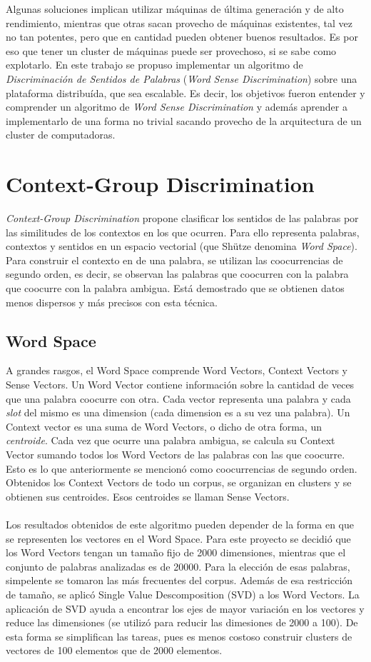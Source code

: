 \documentclass[10pt]{article}
\begin{document}
Algunas soluciones implican utilizar máquinas de última generación y de alto rendimiento, mientras que otras sacan provecho de máquinas existentes, tal vez no tan potentes, pero que en cantidad pueden obtener buenos resultados.
Es por eso que tener un cluster de máquinas puede ser provechoso, si se sabe como explotarlo. En este trabajo se propuso implementar un algoritmo de \emph{Discriminación de Sentidos de Palabras} (\emph{Word Sense Discrimination}) sobre una plataforma distribuída, que sea escalable. Es decir, los objetivos fueron entender y comprender un algoritmo de \emph{Word Sense Discrimination} y además aprender a implementarlo de una forma no trivial sacando provecho de la arquitectura de un cluster de computadoras.

\section{Context-Group Discrimination}
\emph{Context-Group Discrimination} propone clasificar los sentidos de las palabras por las similitudes de los contextos en los que ocurren. Para ello representa palabras, contextos y sentidos en un espacio vectorial (que Shütze denomina \emph{Word Space}). Para construir el contexto en de una palabra, se utilizan las coocurrencias de segundo orden, es decir, se observan las palabras que coocurren con la palabra que coocurre con la palabra ambigua. Está demostrado que se obtienen datos menos dispersos y más precisos con esta técnica.
\subsection{Word Space}
A grandes rasgos, el Word Space comprende Word Vectors, Context Vectors y Sense Vectors.
Un Word Vector contiene información sobre la cantidad de veces que una palabra coocurre con otra. Cada vector representa una palabra y cada \emph{slot} del mismo es una dimension (cada dimension es a su vez una palabra).
Un Context vector es una suma de Word Vectors, o dicho de otra forma, un \emph{centroide}. Cada vez que ocurre una palabra ambigua, se calcula su Context Vector sumando todos los Word Vectors de las palabras con las que coocurre. Esto es lo que anteriormente se mencionó como coocurrencias de segundo orden.
Obtenidos los Context Vectors de todo un corpus, se organizan en clusters y se obtienen sus centroides. Esos centroides se llaman Sense Vectors.
\\
\\
Los resultados obtenidos de este algoritmo pueden depender de la forma en que se representen los vectores en el Word Space. Para este proyecto se decidió que los Word Vectors tengan un tamaño fijo de 2000 dimensiones, mientras que el conjunto de palabras analizadas es de 20000. Para la elección de esas palabras, simpelente se tomaron las más frecuentes del corpus.
Además de esa restricción de tamaño, se aplicó Single Value Descomposition (SVD) a los Word Vectors. La aplicación de SVD ayuda a encontrar los ejes de mayor variación en los vectores y reduce las dimensiones (se utilizó para reducir las dimesiones de 2000 a 100). De esta forma se simplifican las tareas, pues es menos costoso construir clusters de vectores de 100 elementos que de 2000 elementos.
\end{document}
